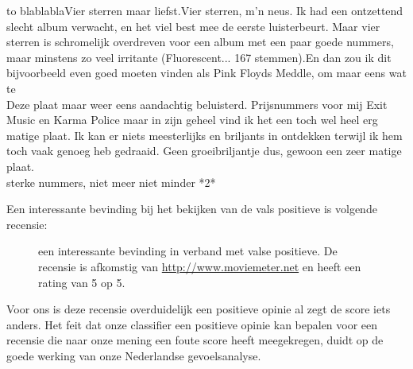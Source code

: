 \begin{table}[H]
\centering
\begin{tabu} to \textwidth {|X|}
\hline
blablablaVier sterren maar liefst.Vier sterren, m'n neus. Ik had een ontzettend slecht album verwacht, en het viel best mee de eerste luisterbeurt. Maar vier sterren is schromelijk overdreven voor een album met een paar goede nummers, maar minstens zo veel irritante (Fluorescent... 167 stemmen).En dan zou ik dit bijvoorbeeld even goed moeten vinden als Pink Floyds Meddle, om maar eens wat te \\ \hline
Deze plaat maar weer eens aandachtig beluisterd. Prijsnummers voor mij Exit Music en Karma Police maar in zijn geheel vind ik het een toch wel heel erg matige plaat. Ik kan er niets meesterlijks en briljants in ontdekken terwijl ik hem toch vaak genoeg heb gedraaid. Geen groeibriljantje dus, gewoon een zeer matige plaat.                                                                         \\  sterke nummers, niet meer niet minder *2*                                                                                                                                                                                                                                                                                                                                                                \\ \hline
\end{tabu}
\caption{Enkele vals positieve uit de muziekdataset}
\end{table}

Een interessante bevinding bij het bekijken van de vals positieve is volgende recensie:

\begin{figure}[H]%
    \centering
    \caption{een interessante bevinding in verband met valse positieve. De recensie is afkomstig van \url{http://www.moviemeter.net} en heeft een rating van 5 op 5. }
\end{figure}

Voor ons is deze recensie overduidelijk een positieve opinie al zegt de score iets anders. Het feit dat onze classifier een positieve opinie kan bepalen voor een recensie die naar onze mening een foute score heeft meegekregen, duidt op de goede werking van onze Nederlandse gevoelsanalyse.


